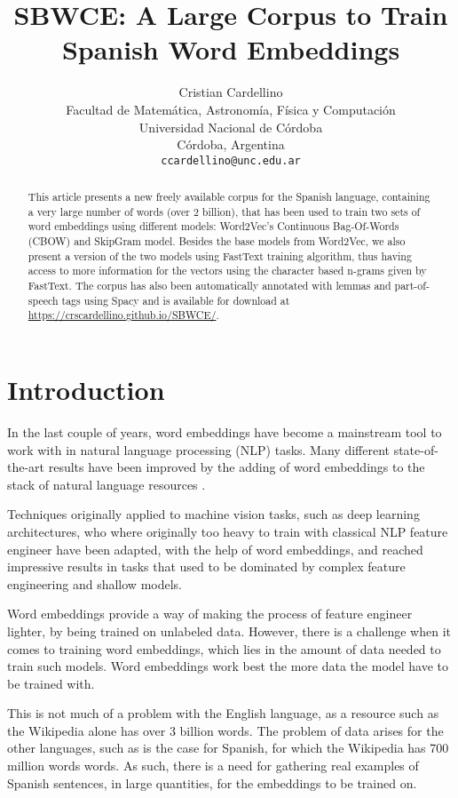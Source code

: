 \documentclass{article}
\title{SBWCE: A Large Corpus to Train Spanish Word Embeddings}
\author{
  Cristian Cardellino \\
  Facultad de Matem\'atica, Astronom\'ia, F\'isica y Computaci\'on \\
  Universidad Nacional de C\'ordoba \\
  C\'ordoba, Argentina \\
  \texttt{ccardellino@unc.edu.ar} \\
}
\date{}
\begin{document}
\maketitle

\begin{abstract}
  This article presents a new freely available corpus for the Spanish language,
  containing a very large number of words (over 2 billion), that has been used
  to train two sets of word embeddings using different models: Word2Vec's
  \cite{DBLP:journals/corr/abs-1301-3781} Continuous Bag-Of-Words (CBOW) and
  SkipGram model. Besides the base models from Word2Vec, we also present a
  version of the two models using FastText \cite{rehurek_lrec} training
  algorithm, thus having access to more information for the vectors using the
  character based n-grams given by FastText. The corpus has also been
  automatically annotated with lemmas and part-of-speech tags using Spacy
  \cite{spacy2} and is available for download at
  \url{https://crscardellino.github.io/SBWCE/}.
\end{abstract}


\section{Introduction}

In the last couple of years, word embeddings have become a mainstream tool to
work with in natural language processing (NLP) tasks. Many different
state-of-the-art results have been improved by the adding of word embeddings to
the stack of natural language resources
\cite{Collobert:2011:NLP:1953048.2078186}.

Techniques originally applied to machine vision tasks, such as deep learning
architectures, who where originally too heavy to train with classical NLP
feature engineer have been adapted, with the help of word embeddings, and
reached impressive results in tasks that used to be dominated by complex
feature engineering and shallow models.

Word embeddings provide a way of making the process of feature engineer
lighter, by being trained on unlabeled data. However, there is a challenge when
it comes to training word embeddings, which lies in the amount of data needed
to train such models. Word embeddings work best the more data the model have to
be trained with.

This is not much of a problem with the English language, as a resource such as
the Wikipedia alone has over 3 billion words. The problem of data arises for
the other languages, such as is the case for Spanish, for which the Wikipedia
has 700 million words words. As such, there is a need for gathering real
examples of Spanish sentences, in large quantities, for the embeddings to be
trained on.
\end{document}
